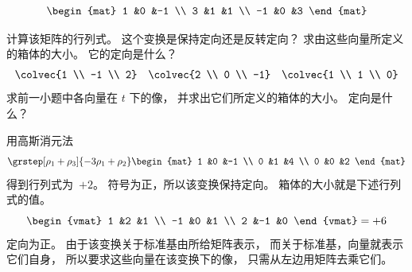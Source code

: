 \begin{exercises}
\begin{equation*}
      \begin{mat}
        1 &0 &-1 \\
        3 &1 &1 \\
       -1 &0 &3
      \end{mat}
    \end{equation*}
    \begin{exparts}
      \partsitem 计算该矩阵的行列式。
        这个变换是保持定向还是反转定向？ 
      \partsitem 求由这些向量所定义的箱体的大小。
        它的定向是什么？
        \begin{equation*}
          \colvec{1 \\ -1 \\ 2}
          \quad
          \colvec{2 \\ 0 \\ -1}
          \quad
          \colvec{1 \\ 1 \\ 0}
        \end{equation*}
      \partsitem 求前一小题中各向量在 $t$ 下的像，
        并求出它们所定义的箱体的大小。
        定向是什么？
    \end{exparts}
    \begin{answer}
      \begin{exparts}
        \partsitem
          用高斯消元法
          \begin{equation*}
          \grstep[\rho_1+\rho_3]{-3\rho_1+\rho_2}
          \begin{mat}
            1 &0   &-1    \\
            0 &1   &4     \\
            0 &0   &2
          \end{mat}
          \end{equation*}
          得到行列式为~$+2$。
          符号为正，所以该变换保持定向。
        \partsitem
          箱体的大小就是下述行列式的值。
          \begin{equation*}
            \begin{vmat}
              1 &2  &1 \\
             -1 &0  &1 \\
              2 &-1 &0
            \end{vmat}
            =+6
          \end{equation*}
          定向为正。
        \partsitem
          由于该变换关于标准基由所给矩阵表示，
          而关于标准基，向量就表示它们自身，
          所以要求这些向量在该变换下的像，
          只需从左边用矩阵去乘它们。
          \begin{equation*}

\end{equation*}
\end{exparts}
\end{answer}
\end{exercises}
